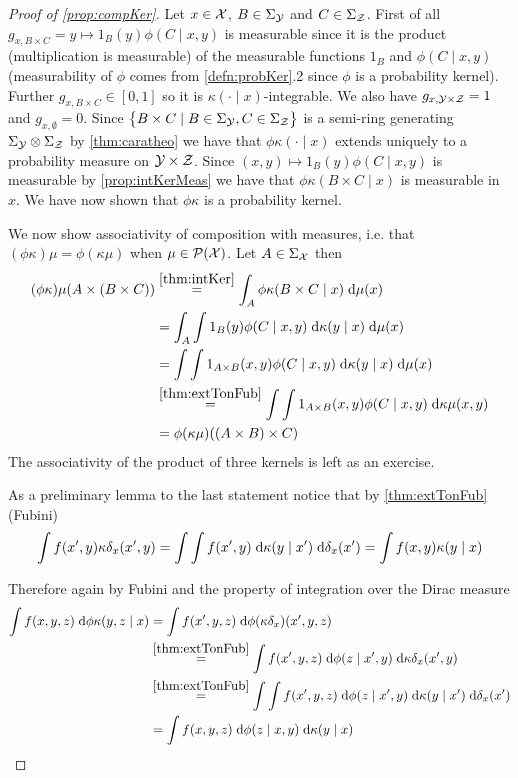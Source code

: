 
\begin{proof}[Proof of \cref{prop:compKer}]
  Let $x \in \mathcal{X}$, $B \in \Sigma_\mathcal{Y}$ and $C \in \Sigma_\mathcal{Z}$.
  First of all $g_{x, B \times C} = y \mapsto 1_B(y) \phi(C \mid x, y)$ is
  measurable since it is the product (multiplication is measurable)
  of the measurable functions $1_B$ and $\phi(C \mid x, y)$
  (measurability of $\phi$ comes from \cref{defn:probKer}.2 since
  $\phi$ is a probability kernel).
  Further $g_{x, B \times C} \in [0,1]$ so it is
  $\kappa(\cdot \mid x)$-integrable.
  We also have $g_{x, \mathcal{Y} \times \mathcal{Z}} = 1$ and $g_{x, \emptyset} = 0$.
  Since
  $\left\{ B \times C \mid B \in \Sigma_\mathcal{Y}, C \in \Sigma_\mathcal{Z} \right\}$
  is a semi-ring generating $\Sigma_\mathcal{Y} \otimes \Sigma_\mathcal{Z}$
  by \cref{thm:caratheo}
  we have that $\phi \kappa( \cdot \mid x)$ extends uniquely to a
  probability measure on $\mathcal{Y} \times \mathcal{Z}$.
  Since $(x, y) \mapsto 1_B(y) \phi(C \mid x, y)$ is measurable
  by \cref{prop:intKerMeas} we have that
  $\phi \kappa(B \times C \mid x)$ is measurable in $x$.
  We have now shown that $\phi \kappa$ is a probability kernel.
  
  We now show associativity of composition with measures, i.e. that
  $(\phi \kappa) \mu = \phi (\kappa \mu)$ when $\mu \in \mathcal{P}(\mathcal{X})$.
  Let $A \in \Sigma_\mathcal{X}$ then
  \begin{align*}
    (\phi \kappa) \mu(A \times (B \times C))
    &\stackrel{\ref{thm:intKer}}{=}
    \int_A \phi\kappa(B \times C \mid x) \; \mathrm{d} \mu (x)
    \\ &= \int_A \int 1_B(y) \phi(C \mid x, y)
    \; \mathrm{d} \kappa(y \mid x) \; \mathrm{d} \mu (x)
    \\ &= \int \int 1_{A \times B}(x, y) \phi(C \mid x, y)
    \; \mathrm{d} \kappa(y \mid x) \; \mathrm{d} \mu (x)
    \\ &\stackrel{\ref{thm:extTonFub}}{=}
    \int \int 1_{A \times B}(x, y) \phi(C \mid x, y)
    \; \mathrm{d} \kappa\mu (x, y)
    \\ &= \phi(\kappa \mu)((A \times B) \times C)
  \end{align*} 
  The associativity of the product of three kernels is left as an
  exercise.

  As a preliminary lemma to the last statement notice that by 
  \cref{thm:extTonFub} (Fubini)
  \[ \int f(x', y) \kappa \delta_x (x', y)
    = \int \int f(x', y) \; \mathrm{d} \kappa(y \mid x') \; \mathrm{d} \delta_x(x')
  = \int f(x, y) \kappa(y \mid x) \]

  Therefore again by Fubini and the property of integration over the
  Dirac measure
  \begin{align*}
    \int f(x, y, z) \; \mathrm{d} \phi \kappa(y, z \mid x)
    &= \int f(x', y, z) \; \mathrm{d} \phi (\kappa \delta_x) (x', y, z)
    \\ & \stackrel{\ref{thm:extTonFub}}{=}
    \int f(x', y, z) \; \mathrm{d} \phi (z \mid x', y)
    \; \mathrm{d} \kappa \delta_x (x', y)
    \\ & \stackrel{\ref{thm:extTonFub}}{=}
    \int \int f(x', y, z) \; \mathrm{d} \phi (z \mid x', y)
    \; \mathrm{d} \kappa(y \mid x') \; \mathrm{d} \delta_x (x')
    \\ &= \int f(x, y, z) \; \mathrm{d} \phi (z \mid x, y)
    \; \mathrm{d} \kappa(y \mid x)
  \end{align*}
  \label{proof:compKer}
\end{proof}
